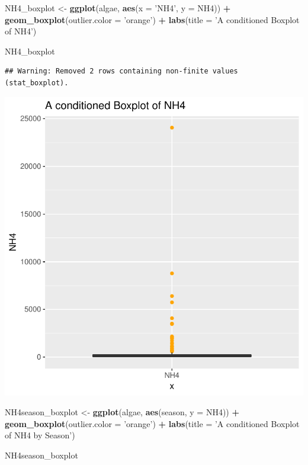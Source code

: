\documentclass[]{article}
\newenvironment{Shaded}{\begin{snugshade}}{\end{snugshade}}
\newcommand{\KeywordTok}[1]{\textcolor[rgb]{0.13,0.29,0.53}{\textbf{#1}}}
\newcommand{\DataTypeTok}[1]{\textcolor[rgb]{0.13,0.29,0.53}{#1}}
\newcommand{\StringTok}[1]{\textcolor[rgb]{0.31,0.60,0.02}{#1}}
\newcommand{\OperatorTok}[1]{\textcolor[rgb]{0.81,0.36,0.00}{\textbf{#1}}}
\newcommand{\NormalTok}[1]{#1}
\begin{document}
\begin{Shaded}
\begin{Highlighting}[]
\NormalTok{NH4_boxplot <-}\StringTok{ }\KeywordTok{ggplot}\NormalTok{(algae, }\KeywordTok{aes}\NormalTok{(}\DataTypeTok{x =} \StringTok{'NH4'}\NormalTok{, }\DataTypeTok{y =}\NormalTok{ NH4)) }\OperatorTok{+}\StringTok{ }
\StringTok{  }\KeywordTok{geom_boxplot}\NormalTok{(}\DataTypeTok{outlier.color =} \StringTok{'orange'}\NormalTok{) }\OperatorTok{+}
\StringTok{  }\KeywordTok{labs}\NormalTok{(}\DataTypeTok{title =} \StringTok{'A conditioned Boxplot of NH4'}\NormalTok{)}

\NormalTok{NH4_boxplot }
\end{Highlighting}
\end{Shaded}

\begin{verbatim}
## Warning: Removed 2 rows containing non-finite values (stat_boxplot).
\end{verbatim}

\begin{center}\includegraphics{homework1-handout_files/figure-latex/unnamed-chunk-3-1} \end{center}

\begin{Shaded}
\begin{Highlighting}[]
\NormalTok{NH4season_boxplot <-}\StringTok{ }\KeywordTok{ggplot}\NormalTok{(algae, }\KeywordTok{aes}\NormalTok{(season, }\DataTypeTok{y =}\NormalTok{ NH4)) }\OperatorTok{+}
\StringTok{  }\KeywordTok{geom_boxplot}\NormalTok{(}\DataTypeTok{outlier.color =} \StringTok{'orange'}\NormalTok{) }\OperatorTok{+}
\StringTok{  }\KeywordTok{labs}\NormalTok{(}\DataTypeTok{title =} \StringTok{'A conditioned Boxplot of NH4 by Season'}\NormalTok{)}

\NormalTok{NH4season_boxplot}
\end{Highlighting}
\end{Shaded}
\end{document}
